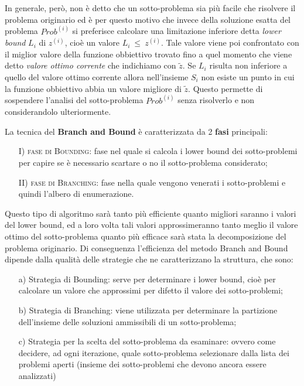 In generale, però, non è detto che un sotto-problema sia più facile che risolvere il problema originario ed è per questo motivo che invece della soluzione esatta del problema $Prob^{(i)}$ si preferisce calcolare una limitazione inferiore detta \textit{lower bound} $L_i$ di $z^{(i)}$, cioè un valore $L_i ~ \leq ~ z^{(i)}$. Tale valore viene poi confrontato con il miglior valore della funzione obbiettivo trovato fino a quel momento che viene detto \textit{valore ottimo corrente} che indichiamo con $\tilde{z}$. Se $L_i$ risulta non inferiore a quello del valore ottimo corrente allora nell'insieme $S_i$ non esiste un punto in cui la funzione obbiettivo abbia un valore migliore di $\tilde{z}$. Questo permette di sospendere l'analisi del sotto-problema $Prob^{(i)}$ senza risolverlo e non considerandolo ulteriormente.

La tecnica del \textbf{Branch and Bound} è caratterizzata da 2 \textbf{fasi} principali:
\begin{enumerate}
\item [I)] \textsc{fase di Bounding}: fase nel quale si calcola i lower bound dei sotto-problemi per capire  se è necessario scartare o no il sotto-problema considerato;
\item [II)] \textsc{fase di Branching}: fase nella quale vengono venerati i sotto-problemi e quindi l'albero di enumerazione.
\end{enumerate}

Questo tipo di algoritmo sarà tanto più efficiente quanto migliori saranno i valori del lower bound, ed a loro volta tali valori approssimeranno tanto meglio il valore ottimo del sotto-problema quanto più efficace sarà stata la decomposizione del problema originario. Di conseguenza l'efficienza del metodo Branch and Bound dipende dalla qualità delle strategie che ne caratterizzano la struttura, che sono:
\begin{itemize}
\item [a)] Strategia di Bounding: serve per determinare i lower bound, cioè per calcolare un valore che approssimi per difetto il valore dei sotto-problemi;
\item [b)] Strategia di Branching: viene utilizzata per determinare la partizione dell'insieme delle soluzioni ammissibili di un sotto-problema;
\item [c)] Strategia per la scelta del sotto-problema da esaminare: ovvero come decidere, ad ogni iterazione, quale sotto-problema selezionare dalla lista dei problemi aperti (insieme dei sotto-problemi che devono ancora essere analizzati)
\end{itemize}

